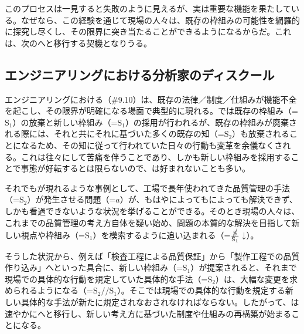 このプロセスは一見すると失敗のように見えるが、実は重要な機能を果たしている。なぜなら、この経験を通じて現場の人々は、既存の枠組みの可能性を網羅的に探究し尽くし、その限界に突き当たることができるようになるからだ。これは、次のへと移行する契機となりうる。

\subsection{エンジニアリングにおける分析家のディスクール}\label{ux30a8ux30f3ux30b8ux30cbux30a2ux30eaux30f3ux30b0ux306bux304aux3051ux308bux5206ux6790ux5bb6ux306eux30c7ux30a3ux30b9ux30afux30fcux30eb}

エンジニアリングにおける（\#9.10）は、既存の法律／制度／仕組みが機能不全を起こし、その限界が明確になる場面で典型的に現れる。では既存の枠組み（=\(\textrm{S}_1\)）の放棄と新しい枠組み（=\(\textrm{S}_1\)）の採用が行われるが、既存の枠組みが廃棄される際には、それと共にそれに基づいた多くの既存の知（=\(\textrm{S}_2\)）も放棄されることになるため、その知に従って行われていた日々の行動も変革を余儀なくされる。これは往々にして苦痛を伴うことであり、しかも新しい枠組みを採用することで事態が好転するとは限らないので、は好まれないことも多い。

それでもが現れるような事例として、工場で長年使われてきた品質管理の手法（=\(\textrm{S}_2\)）が発生させる問題（=\(a\)）が、もはやによってもによっても解決できず、しかも看過できないような状況を挙げることができる。そのとき現場の人々は、これまでの品質管理の考え方自体を疑い始め、問題の本質的な解決を目指して新しい視点や枠組み（=\(\textrm{S}_1\)）を模索するように追い込まれる（=\(\frac{\cancel{\textrm{S}}}{\textrm{S}_1}\downarrow\)）。

そうした状況から、例えば「検査工程による品質保証」から「製作工程での品質作り込み」へといった具合に、新しい枠組み（=\(\textrm{S}_1\)）が提案されると、それまで現場での具体的な行動を規定していた具体的な手法（=\(\textrm{S}_2\)）は、大幅な変更を求められるようになる（=\(\textrm{S}_2//\textrm{S}_1\)）。そこでは現場での具体的な行動を規定する新しい具体的な手法が新たに規定されなおされなければならない。したがって、は速やかにへと移行し、新しい考え方に基づいた制度や仕組みの再構築が始まることになる。

